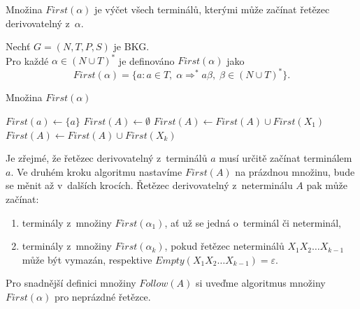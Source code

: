 Množina $First(\alpha)$ je výčet všech terminálů, kterými může začínat řetězec derivovatelný z~$\alpha$.
\begin{definition}\label{def_mnozina_first}
    Nechť $G = (N, T, P, S)$ je BKG.\\
    Pro každé $\alpha \in (N \cup T)^*$ je definováno $First(\alpha)$ jako
    \begin{equation*}
        First(\alpha) = \{a: a \in T,\; \alpha \Rightarrow^* a\beta,\; \beta \in (N \cup T)^*\}.
    \end{equation*} 
\end{definition}
\begin{algorithm}[h]
    \caption{Množina $First(\alpha)$}
    \label{alg_mnozina_first}
    \begin{algorithmic}[1]
        \NewLine
            \State $First(a) \gets \{a\}$
        \EndFor
            \State $First(A) \gets \emptyset$
        \EndFor
                \State $First(A) \gets First(A) \cup First(X_1)$
                    \State $First(A) \gets First(A) \cup First(X_k)$ 
                \EndIf
            \EndIf
        \EndWhile
    \end{algorithmic}
\end{algorithm}
Je zřejmé, že řetězec derivovatelný z~terminálů $a$ musí určitě začínat terminálem $a$.
Ve druhém kroku algoritmu nastavíme $First(A)$ na prázdnou množinu, bude se měnit až v~dalších krocích.
Řetězec derivovatelný z~neterminálu $A$ pak může začínat:
\begin{enumerate}
    \item terminály z~množiny $First(\alpha_1)$, ať už se jedná o~terminál či neterminál,
    \item terminály z~množiny $First(\alpha_k)$, pokud řetězec neterminálů $X_1X_2\ldots X_{k-1}$ může být vymazán, respektive $Empty(X_1X_2\ldots X_{k-1}) = \varepsilon$.  
\end{enumerate}
Pro snadnější definici množiny $Follow(A)$ si uveďme algoritmus množiny $First(\alpha)$ pro neprázdné řetězce.
